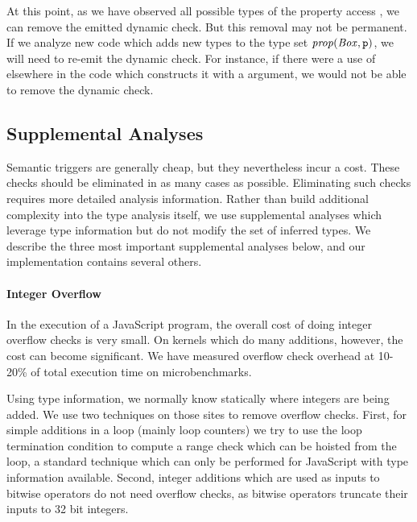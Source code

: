 At this point, as we have observed all possible types of the property access , we can remove the emitted dynamic check. But this removal may not be permanent. If we analyze new code which adds new types to the type set $\mathit{prop}(\mathit{Box}, \texttt{p})$, we will need to re-emit the dynamic check. For instance, if there were a use of  elsewhere in the code which constructs it with a  argument, we would not be able to remove the dynamic check.

\subsection{Supplemental Analyses}
\label{sec:supplemental-analyses}

Semantic triggers are generally cheap, but they nevertheless incur a cost.
These checks should be eliminated in as many cases as possible.
Eliminating such checks requires more detailed analysis information.
Rather than build additional complexity into the type analysis itself,
we use supplemental analyses which leverage type information but do not
modify the set of inferred types.
We describe the three most important supplemental analyses below, and
our implementation contains several others.

\paragraph{Integer Overflow}

In the execution of a JavaScript program, the overall cost of doing integer
overflow checks is very small.
On kernels which do many additions, however, the cost can become significant.
We have measured overflow check overhead at 10-20\% of total execution
time on microbenchmarks.

Using type information, we normally know statically where integers are being
added. We use two techniques on those sites to remove overflow checks.
First, for simple additions in a loop (mainly loop counters) we try to use
the loop termination condition to compute a range
check which can be hoisted from the loop, a standard technique
which can only be performed for JavaScript with type information available.
Second, integer additions which are used as inputs to bitwise operators
do not need overflow checks, as bitwise operators truncate their inputs to 32
bit integers.


